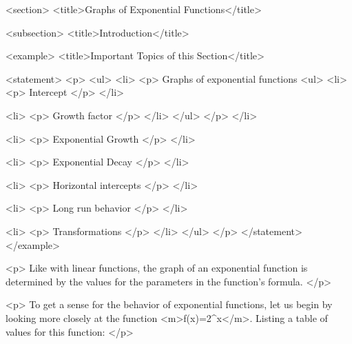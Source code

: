 <section>
    <title>Graphs of Exponential Functions</title>

    <subsection>
        <title>Introduction</title>

        <example>
            <title>Important Topics of this Section</title>

            <statement>
                <p>
                    <ul>
                        <li>
                            <p>
                                Graphs of exponential functions
                                <ul>
                                    <li>
                                        <p>
                                            Intercept
                                        </p>
                                    </li>

                                    <li>
                                        <p>
                                            Growth factor
                                        </p>
                                    </li>
                                </ul>
                            </p>
                        </li>

                        <li>
                            <p>
                                Exponential Growth
                            </p>
                        </li>

                        <li>
                            <p>
                                Exponential Decay
                            </p>
                        </li>

                        <li>
                            <p>
                                Horizontal intercepts
                            </p>
                        </li>

                        <li>
                            <p>
                                Long run behavior
                            </p>
                        </li>

                        <li>
                            <p>
                                Transformations
                            </p>
                        </li>
                    </ul>
                </p>
            </statement>
        </example>

        <p>
            Like with linear functions, the graph of an exponential function is determined by the values for the parameters in the function’s formula.
        </p>

        <p>
            To get a sense for the behavior of exponential functions, let us begin by looking more closely at the function <m>f(x)=2^{x}</m>.
            Listing a table of values for this function:
        </p>

